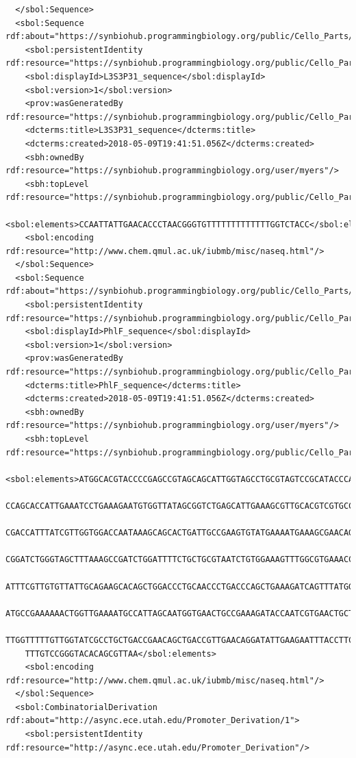 \begin{lstlisting}
  </sbol:Sequence>
  <sbol:Sequence rdf:about="https://synbiohub.programmingbiology.org/public/Cello_Parts/L3S3P31_sequence/1">
    <sbol:persistentIdentity rdf:resource="https://synbiohub.programmingbiology.org/public/Cello_Parts/L3S3P31_sequence"/>
    <sbol:displayId>L3S3P31_sequence</sbol:displayId>
    <sbol:version>1</sbol:version>
    <prov:wasGeneratedBy rdf:resource="https://synbiohub.programmingbiology.org/public/Cello_Parts/CelloUCF2sbol_Activity/1"/>
    <dcterms:title>L3S3P31_sequence</dcterms:title>
    <dcterms:created>2018-05-09T19:41:51.056Z</dcterms:created>
    <sbh:ownedBy rdf:resource="https://synbiohub.programmingbiology.org/user/myers"/>
    <sbh:topLevel rdf:resource="https://synbiohub.programmingbiology.org/public/Cello_Parts/L3S3P31_sequence/1"/>
    <sbol:elements>CCAATTATTGAACACCCTAACGGGTGTTTTTTTTTTTTTGGTCTACC</sbol:elements>
    <sbol:encoding rdf:resource="http://www.chem.qmul.ac.uk/iubmb/misc/naseq.html"/>
  </sbol:Sequence>
  <sbol:Sequence rdf:about="https://synbiohub.programmingbiology.org/public/Cello_Parts/PhlF_sequence/1">
    <sbol:persistentIdentity rdf:resource="https://synbiohub.programmingbiology.org/public/Cello_Parts/PhlF_sequence"/>
    <sbol:displayId>PhlF_sequence</sbol:displayId>
    <sbol:version>1</sbol:version>
    <prov:wasGeneratedBy rdf:resource="https://synbiohub.programmingbiology.org/public/Cello_Parts/CelloUCF2sbol_Activity/1"/>
    <dcterms:title>PhlF_sequence</dcterms:title>
    <dcterms:created>2018-05-09T19:41:51.056Z</dcterms:created>
    <sbh:ownedBy rdf:resource="https://synbiohub.programmingbiology.org/user/myers"/>
    <sbh:topLevel rdf:resource="https://synbiohub.programmingbiology.org/public/Cello_Parts/PhlF_sequence/1"/>
    <sbol:elements>ATGGCACGTACCCCGAGCCGTAGCAGCATTGGTAGCCTGCGTAGTCCGCATACCCATAAAGCAATTCTGA
    CCAGCACCATTGAAATCCTGAAAGAATGTGGTTATAGCGGTCTGAGCATTGAAAGCGTTGCACGTCGTGCCGGTGCAAGCAAAC
    CGACCATTTATCGTTGGTGGACCAATAAAGCAGCACTGATTGCCGAAGTGTATGAAAATGAAAGCGAACAGGTGCGTAAATTTC
    CGGATCTGGGTAGCTTTAAAGCCGATCTGGATTTTCTGCTGCGTAATCTGTGGAAAGTTTGGCGTGAAACCATTTGTGGTGAAGC
    ATTTCGTTGTGTTATTGCAGAAGCACAGCTGGACCCTGCAACCCTGACCCAGCTGAAAGATCAGTTTATGGAACGTCGTCGTGAG
    ATGCCGAAAAAACTGGTTGAAAATGCCATTAGCAATGGTGAACTGCCGAAAGATACCAATCGTGAACTGCTGCTGGATATGATTT
    TTGGTTTTTGTTGGTATCGCCTGCTGACCGAACAGCTGACCGTTGAACAGGATATTGAAGAATTTACCTTCCTGCTGATTAATGGTG
    TTTGTCCGGGTACACAGCGTTAA</sbol:elements>
    <sbol:encoding rdf:resource="http://www.chem.qmul.ac.uk/iubmb/misc/naseq.html"/>
  </sbol:Sequence>
  <sbol:CombinatorialDerivation rdf:about="http://async.ece.utah.edu/Promoter_Derivation/1">
    <sbol:persistentIdentity rdf:resource="http://async.ece.utah.edu/Promoter_Derivation"/>

\end{lstlisting}
